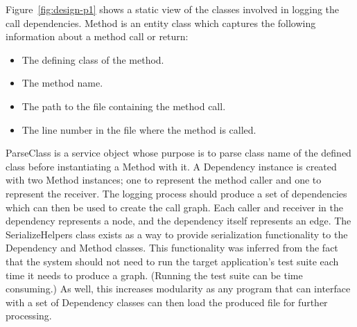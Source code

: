 Figure~\ref{fig:design-p1} shows a static view of the classes involved in logging the call dependencies. Method is an entity class which captures the following information about a method call or return:
\begin{itemize}
  \item The defining class of the method.
  \item The method name.
  \item The path to the file containing the method call.
  \item The line number in the file where the method is called.
\end{itemize}
ParseClass is a service object whose purpose is to parse class name of the defined class before instantiating a Method with it. A Dependency instance is created with two Method instances; one to represent the method caller and one to represent the receiver. The logging process should produce a set of dependencies which can then be used to create the call graph. Each caller and receiver in the dependency represents a node, and the dependency itself represents an edge. The SerializeHelpers class exists as a way to provide serialization functionality to the Dependency and Method classes. This functionality was inferred from the fact that the system should not need to run the target application's test suite each time it needs to produce a graph. (Running the test suite can be time consuming.) As well, this increases modularity as any program that can interface with a set of Dependency classes can then load the produced file for further processing.
